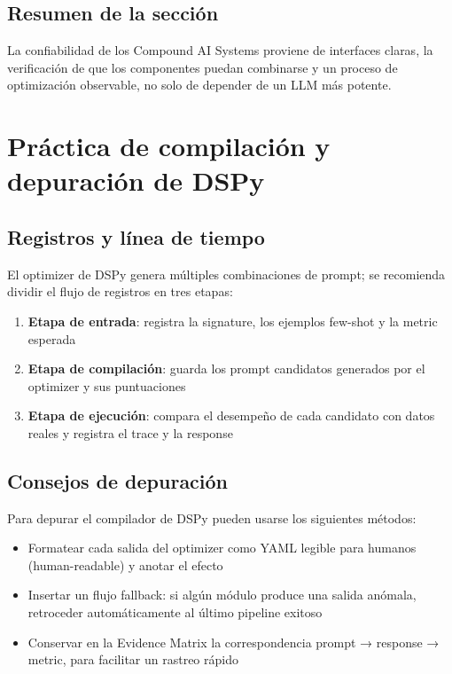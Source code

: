 \documentclass[a4paper]{article}
\begin{document}
\subsection{Resumen de la sección}

La confiabilidad de los Compound AI Systems proviene de interfaces claras, la verificación de que los componentes puedan combinarse y un proceso de optimización observable, no solo de depender de un LLM más potente.
\section{Práctica de compilación y depuración de DSPy}

\subsection{Registros y línea de tiempo}

El optimizer de DSPy genera múltiples combinaciones de prompt; se recomienda dividir el flujo de registros en tres etapas:

\begin{enumerate}
    \item \textbf{Etapa de entrada}: registra la signature, los ejemplos few-shot y la metric esperada
    \item \textbf{Etapa de compilación}: guarda los prompt candidatos generados por el optimizer y sus puntuaciones
    \item \textbf{Etapa de ejecución}: compara el desempeño de cada candidato con datos reales y registra el trace y la response
\end{enumerate}

\subsection{Consejos de depuración}

Para depurar el compilador de DSPy pueden usarse los siguientes métodos:

\begin{itemize}
    \item Formatear cada salida del optimizer como YAML legible para humanos (human-readable) y anotar el efecto
    \item Insertar un flujo fallback: si algún módulo produce una salida anómala, retroceder automáticamente al último pipeline exitoso
    \item Conservar en la Evidence Matrix la correspondencia prompt → response → metric, para facilitar un rastreo rápido
\end{itemize}
\end{document}
